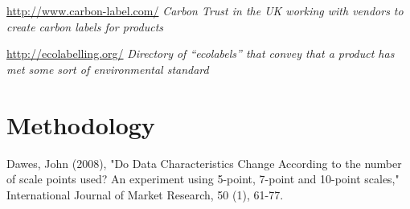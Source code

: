 \url{http://www.carbon-label.com/} \emph{Carbon Trust in the UK working with vendors to create carbon labels for products}

\url{http://ecolabelling.org/} \emph{Directory of ``ecolabels'' that convey that a product has met some sort of environmental standard}

\section{Methodology}
Dawes, John (2008), "Do Data Characteristics Change According to the number of scale points used? An experiment using 5-point, 7-point and 10-point scales," International Journal of Market Research, 50 (1), 61-77.